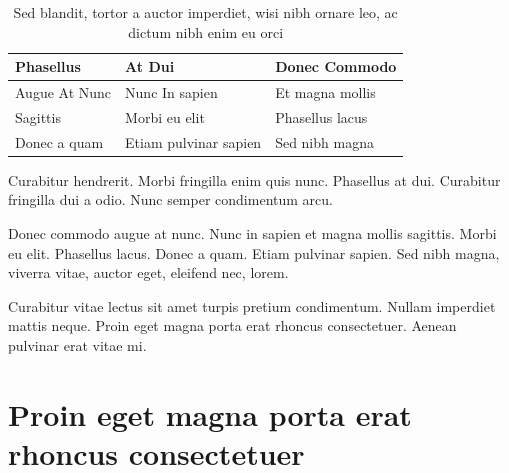 \documentclass[cfonts,nofontsdir]{nostarch}
\begin{document}
\begin{table}[tp]
  \caption[Sed blandit, tortor a auctor]{Sed blandit, tortor a auctor
    imperdiet, wisi nibh ornare leo, 
    ac dictum nibh enim eu orci}
  \begin{tabular}{lll}
    \toprule
    \thfont Phasellus &  \thfont At Dui       & \thfont Donec Commodo \\
    \midrule    
     Augue At Nunc    & Nunc In  sapien       & Et magna mollis \\
     Sagittis         &  Morbi eu elit        &  Phasellus lacus\\
     Donec a quam     & Etiam pulvinar sapien & Sed nibh magna\\
    \bottomrule
  \end{tabular}
\label{tab:one}
\end{table}

\lipsum[60]

Curabitur hendrerit. Morbi fringilla enim quis nunc.
Phasellus at dui. Curabitur fringilla dui a odio.  Nunc
semper condimentum arcu.
\begin{note}
  Donec commodo augue at nunc. Nunc in
  sapien et magna mollis sagittis. Morbi eu elit.
  Phasellus lacus.  Donec a quam. Etiam pulvinar sapien.
  Sed nibh magna, viverra vitae, auctor eget, eleifend
  nec, lorem.
\end{note}
Curabitur vitae lectus sit amet turpis pretium
condimentum. Nullam imperdiet mattis neque. Proin eget magna porta
erat rhoncus consectetuer. Aenean pulvinar erat vitae mi.


\section{Proin eget magna porta erat rhoncus consectetuer}

\lipsum[123-125]
\end{document}

